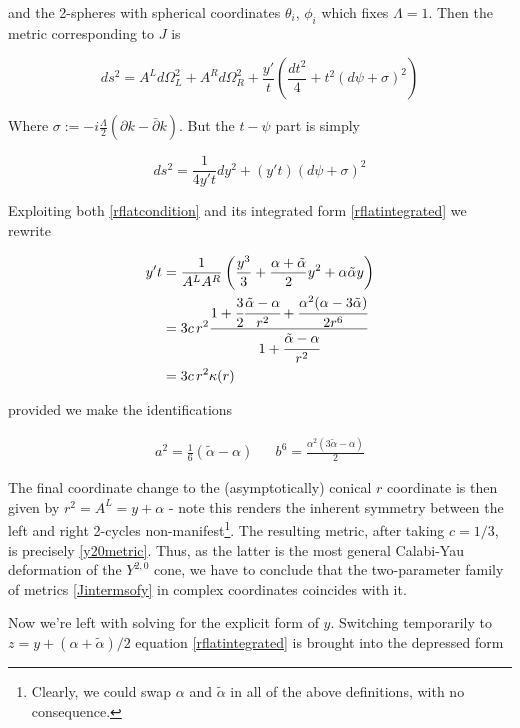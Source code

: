 and the 2-spheres with spherical coordinates $\theta_i$, $\phi_i$ which fixes $\Lambda = 1$. Then the metric corresponding to $J$ is

\begin{equation}
	ds^2 = A^L d\Omega^2_L + A^R d\Omega^2_R + \frac{y'}{t} \left( \frac{dt^2}{4} + t^2 (d\psi + \sigma)^2 \right)
\end{equation}

Where $\sigma := -i\frac{\Lambda}{2}(\partial k - \bar \partial k)$. But the $t-\psi$ part is simply

\begin{equation}
	ds^2 = \frac{1}{4y't} dy^2 + (y' t) (d\psi + \sigma)^2
\end{equation}

Exploiting both \ref{rflatcondition} and its integrated form \ref{rflatintegrated} we rewrite

\begin{align}
	y't & = \frac{1}{A^L A^R} \left( \frac{y^3}{3} + \frac{\alpha + \tilde{\alpha}}{2} y^2 + \alpha \tilde{\alpha} y \right)\\
	& = 3c\,r^2 \frac{1+ \cfrac{3}{2} \cfrac{\tilde{\alpha} - \alpha}{r^2} + \cfrac{\alpha^{2}(\alpha - 3 \tilde{\alpha})}{2r^6} }{1+ \cfrac{\tilde{\alpha} -\alpha}{r^2} }\\
	& = 3c\,r^2 \kappa(r)
\end{align}

provided we make the identifications

\begin{align}
	a^2 = \frac{1}{6}(\tilde{\alpha} - \alpha) && b^6 = \frac{\alpha^{2}(3\tilde{\alpha}-\alpha)}2
	\label{}
\end{align}

The final coordinate change to the (asymptotically) conical $r$ coordinate is then given by $r^2 = A^L = y + \alpha$ - note this renders the inherent symmetry between the left and right 2-cycles non-manifest\footnote{Clearly, we could swap $\alpha$ and $\tilde{\alpha}$ in all of the above definitions, with no consequence.}. The resulting metric, after taking $c=1/3$, is precisely \ref{y20metric}. Thus, as the latter is the most general Calabi-Yau deformation of the $Y^{2,0}$ cone, we have to conclude that the two-parameter family of metrics \ref{Jintermsofy} in complex coordinates coincides with it.

Now we're left with solving for the explicit form of $y$. Switching temporarily to $z = y + (\alpha + \tilde\alpha)/2$ equation \ref{rflatintegrated} is brought into the depressed form

